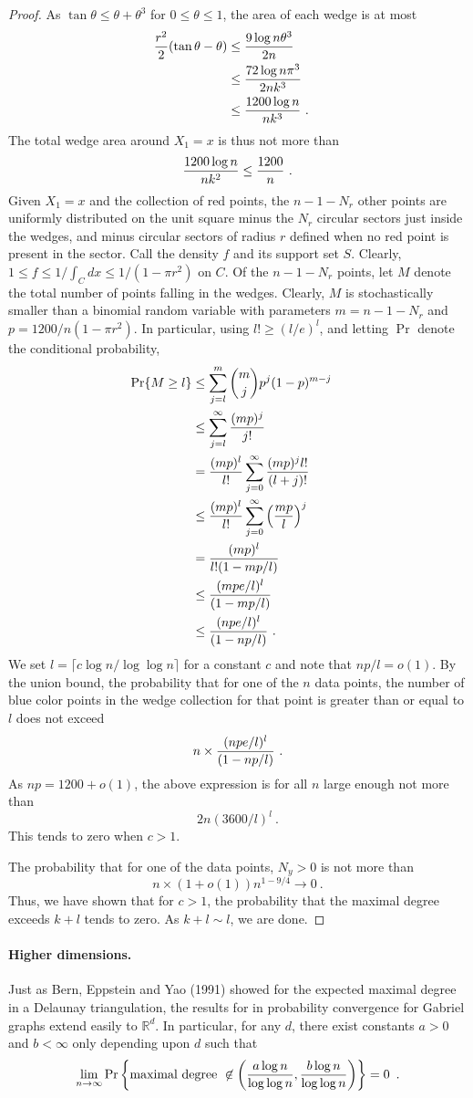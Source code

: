 \documentclass[lotsofwhite,charterfonts]{patmorin}
\newcommand{\RR}{\mathbb{R}}
\newcommand{\PROB}{\Pr}
\begin{document}
\begin{proof}
As $\tan \theta \le \theta + \theta^3$ for $0 \le \theta \le 1$,
the area of each wedge is at most
\[
\begin{aligned}
{ r^2 \over 2} (\tan \theta - \theta)
&\le { 9 \log n \theta^3 \over 2n}  \cr
&\le { 72 \log n \pi^3 \over 2nk^3}  \cr
&\le { 1200 \log n \over n k^3} ~. \cr
\end{aligned}
\]
The total wedge area around $X_1 = x$ is thus not more
than
\[
{ 1200 \log n \over n k^2 } \le { 1200 \over n }~.
\]
Given $X_1 = x$ and the collection of red points,
the $n-1-N_r$ other points are uniformly distributed
on the unit square minus the $N_r$ circular
sectors just inside the wedges, and minus 
circular sectors of radius $r$ defined when no
red point is present in the sector. Call the density $f$
and its support set $S$. Clearly, 
$1 \le f \le 1/\int_C dx \le 1/(1-\pi r^2)$ on $C$.
Of the $n-1-N_r$ points, let $M$ denote the total
number of points falling in the wedges.
Clearly, $M$ is stochastically smaller
than a binomial random variable with parameters
$m = n-1-N_r$ and $p = 1200/n(1-\pi r^2)$.
In particular, using $l! \ge (l/e)^l$,
and letting $\PROB$ denote the conditional probability,
\[
\begin{aligned}
\PROB \{ M \ge l \}
&\le \sum_{j=l}^m {m \choose j} p^j (1-p)^{m-j} \cr
&\le \sum_{j=l}^\infty {(mp)^j \over j!}  \cr
&=   {(mp)^l \over l!} \sum_{j=0}^\infty {(mp)^j l! \over (l+j)!}  \cr
&\le {(mp)^l \over l!} \sum_{j=0}^\infty \left( {mp \over l} \right)^j  \cr
&=   {(mp)^l \over l! (1-mp/l)}  \cr
&\le   {(mpe/l)^l \over (1-mp/l)}  \cr
&\le   {(npe/l)^l \over (1-np/l)} ~. \cr
\end{aligned}
\]
We set $l = \lceil c \log n / \log \log n \rceil$ for a constant $c$
and note that $np/l = o(1)$.
By the union bound, 
the probability that for one of the $n$ data points,
the number of blue color points in the wedge collection
for that point is greater than or equal to $l$ does not
exceed 
\[
n \times {(npe/l)^l \over (1-np/l)} ~. 
\]
As $np = 1200+o(1)$, the above expression is for all $n$
large enough not more than
\[
2n (3600/l)^l~.
\]
This tends to zero when $c > 1$.

The probability that for one of the data points,
$N_y > 0$ is not more than
\[
n \times (1+o(1)) n^{1-9/4} \to 0~.
\]
Thus, we have shown that for $c > 1$, 
the probability that the maximal degree
exceeds $k+l$ tends to zero. As $k+l \sim l$, we are done.
\end{proof}


\paragraph{Higher dimensions.}
Just as Bern, Eppstein and Yao (1991) showed for the
expected maximal degree in a Delaunay triangulation, 
the results for in probability convergence for Gabriel graphs
extend easily to $\RR^d$. In particular,
for any $d$, there exist constants $a>0$ and $b < \infty$ 
only depending upon $d$ such that
\[
\lim_{n\to\infty} \PROB \left\{ \hbox{\rm maximal degree}~\not\in 
  \left( {a \log n \over \log \log n} , { b \log n \over \log \log n} \right)
  \right\} = 0 \enspace .
\]
\end{document}

